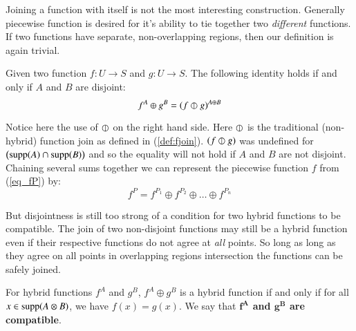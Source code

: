 Joining a function with itself is not the most interesting construction.
Generally piecewise function is desired for it's ability to tie together two \emph{different} functions.
If two functions have separate, non-overlapping regions, then our definition is again trivial.


\begin{theorem}
	\label{thm:compatible2}
	Given two function $f : U \to S$ and $g : U \to S$. The following identity holds if and only if $A$ and $B$ are disjoint:
	\begin{equation}
		f^A \oplus g^B = (f \varobar g)^{A \oplus B}
	\end{equation}
\end{theorem}


Notice here the use of $\varobar$ on the right hand side.
Here $\varobar$ is the traditional (non-hybrid) function join as defined in (\ref{def:fjoin}).
$(f \varobar g)$ was undefined for $\left( \text{supp}(A) \cap \text{supp}(B) \right)$ 
and so the equality will not hold if $A$ and $B$ are not disjoint.
Chaining several sums together we can represent the piecewise function $f$ from (\ref{eq_fP}) by:
\begin{equation*}
 	f^P = f^{P_1} \oplus f^{P_2} \oplus \ldots \oplus f^{P_n}
\end{equation*}



But disjointness is still too strong of a condition for two hybrid functions to be compatible.
The join of two non-disjoint functions may still be a hybrid function 
even if their respective functions do not agree at \emph{all} points.
So long as long as they agree on all points in overlapping regions intersection the functions can be safely joined.


\begin{definition}
	For hybrid functions $f^A$ and $g^B$, $f^A \oplus g^B$ is a hybrid function
	if and only if for all $x \in \text{supp} (A \otimes B)$, we have $f(x) = g(x)$.
	We say that \textbf{$\boldsymbol{f^A}$ and $\boldsymbol{g^B}$ are compatible}.
\end{definition}


